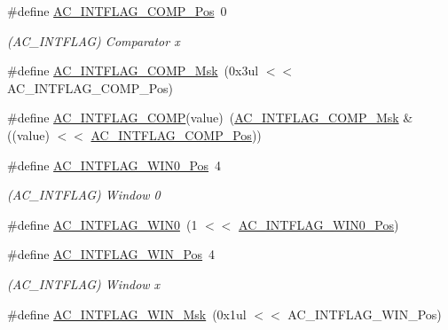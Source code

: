 \begin{DoxyCompactItemize}
\item 
\#define \mbox{\hyperlink{group___s_a_m_d21___a_c_ga5ec6d9f6399298e5873a182d7c171cd6}{A\+C\+\_\+\+I\+N\+T\+F\+L\+A\+G\+\_\+\+C\+O\+M\+P\+\_\+\+Pos}}~0
\begin{DoxyCompactList}\small\item\em (A\+C\+\_\+\+I\+N\+T\+F\+L\+AG) Comparator x \end{DoxyCompactList}\item 
\#define \mbox{\hyperlink{group___s_a_m_d21___a_c_ga0b0b6bcb614e027f81546f4145b07242}{A\+C\+\_\+\+I\+N\+T\+F\+L\+A\+G\+\_\+\+C\+O\+M\+P\+\_\+\+Msk}}~(0x3ul $<$$<$ A\+C\+\_\+\+I\+N\+T\+F\+L\+A\+G\+\_\+\+C\+O\+M\+P\+\_\+\+Pos)
\item 
\#define \mbox{\hyperlink{group___s_a_m_d21___a_c_gaeaa4d63013e1a35f3528cfaa354cff1e}{A\+C\+\_\+\+I\+N\+T\+F\+L\+A\+G\+\_\+\+C\+O\+MP}}(value)~(\mbox{\hyperlink{group___s_a_m_d21___a_c_ga0b0b6bcb614e027f81546f4145b07242}{A\+C\+\_\+\+I\+N\+T\+F\+L\+A\+G\+\_\+\+C\+O\+M\+P\+\_\+\+Msk}} \& ((value) $<$$<$ \mbox{\hyperlink{group___s_a_m_d21___a_c_ga5ec6d9f6399298e5873a182d7c171cd6}{A\+C\+\_\+\+I\+N\+T\+F\+L\+A\+G\+\_\+\+C\+O\+M\+P\+\_\+\+Pos}}))
\item 
\#define \mbox{\hyperlink{group___s_a_m_d21___a_c_ga9db46160e34e14edd76900fd5f8420f3}{A\+C\+\_\+\+I\+N\+T\+F\+L\+A\+G\+\_\+\+W\+I\+N0\+\_\+\+Pos}}~4
\begin{DoxyCompactList}\small\item\em (A\+C\+\_\+\+I\+N\+T\+F\+L\+AG) Window 0 \end{DoxyCompactList}\item 
\#define \mbox{\hyperlink{group___s_a_m_d21___a_c_ga2d545125f06ba57019482f0945205252}{A\+C\+\_\+\+I\+N\+T\+F\+L\+A\+G\+\_\+\+W\+I\+N0}}~(1 $<$$<$ \mbox{\hyperlink{group___s_a_m_d21___a_c_ga9db46160e34e14edd76900fd5f8420f3}{A\+C\+\_\+\+I\+N\+T\+F\+L\+A\+G\+\_\+\+W\+I\+N0\+\_\+\+Pos}})
\item 
\#define \mbox{\hyperlink{group___s_a_m_d21___a_c_gab8feb07a41c8519472bce0d6b09d568d}{A\+C\+\_\+\+I\+N\+T\+F\+L\+A\+G\+\_\+\+W\+I\+N\+\_\+\+Pos}}~4
\begin{DoxyCompactList}\small\item\em (A\+C\+\_\+\+I\+N\+T\+F\+L\+AG) Window x \end{DoxyCompactList}\item 
\#define \mbox{\hyperlink{group___s_a_m_d21___a_c_gaffd6b3fa5bd9b71b4ccce3fb652b5539}{A\+C\+\_\+\+I\+N\+T\+F\+L\+A\+G\+\_\+\+W\+I\+N\+\_\+\+Msk}}~(0x1ul $<$$<$ A\+C\+\_\+\+I\+N\+T\+F\+L\+A\+G\+\_\+\+W\+I\+N\+\_\+\+Pos)

\end{DoxyCompactItemize}

